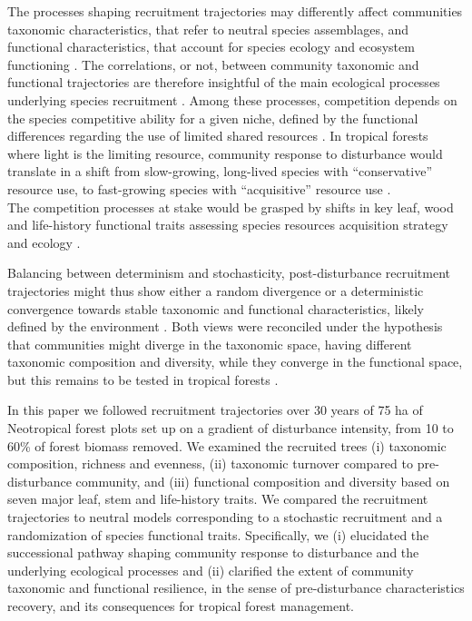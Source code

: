 \documentclass[
  11pt,
  french,
  A4paper,
  extrafontsizes,onecolumn,openright
  ]{memoir}
\begin{document}
The processes shaping recruitment trajectories may differently affect
communities taxonomic characteristics, that refer to neutral species
assemblages, and functional characteristics, that account for species
ecology and ecosystem functioning \autocites{Violle2007b}{Kunstler2016}.
The correlations, or not, between community taxonomic and functional
trajectories are therefore insightful of the main ecological processes
underlying species recruitment \autocite{Fukami2005}. Among these
processes, competition depends on the species competitive ability for a
given niche, defined by the functional differences regarding the use of
limited shared resources \autocite{Perronne2017}. In tropical forests
where light is the limiting resource, community response to disturbance
would translate in a shift from slow-growing, long-lived species with
``conservative'' resource use, to fast-growing species with
``acquisitive'' resource use
\autocites{Denslow1980}{Molino2001}{Bongers2009}.\\
The competition processes at stake would be grasped by shifts in key
leaf, wood and life-history functional traits assessing species
resources acquisition strategy and ecology
\autocites{Wright2004}{Chave2009b}{Herault2011}.

Balancing between determinism and stochasticity, post-disturbance
recruitment trajectories might thus show either a random divergence or a
deterministic convergence towards stable taxonomic and functional
characteristics, likely defined by the environment
\autocites{Clements1916}{Diamond1975}. Both views were reconciled under
the hypothesis that communities might diverge in the taxonomic space,
having different taxonomic composition and diversity, while they
converge in the functional space, but this remains to be tested in
tropical forests \autocites{Fukami2005}{Li2018}.

In this paper we followed recruitment trajectories over 30 years of 75
ha of Neotropical forest plots set up on a gradient of disturbance
intensity, from 10 to 60\% of forest biomass removed. We examined the
recruited trees (i) taxonomic composition, richness and evenness, (ii)
taxonomic turnover compared to pre-disturbance community, and (iii)
functional composition and diversity based on seven major leaf, stem and
life-history traits. We compared the recruitment trajectories to neutral
models corresponding to a stochastic recruitment and a randomization of
species functional traits. Specifically, we (i) elucidated the
successional pathway shaping community response to disturbance and the
underlying ecological processes and (ii) clarified the extent of
community taxonomic and functional resilience, in the sense of
pre-disturbance characteristics recovery, and its consequences for
tropical forest management.
\end{document}
